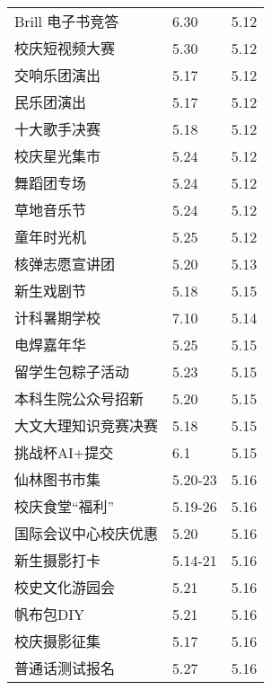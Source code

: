 \documentclass[letterpaper, 12pt]{article}
\begin{document}
\begin{multicols}{2}
{\begin{longtable}{|>{\centering\arraybackslash}m{}|m{}|m{}|}
    Brill 电子书竞答 & 6.30 & 5.12\\
    校庆短视频大赛 & 5.30 & 5.12\\
    交响乐团演出 & 5.17 & 5.12\\
    民乐团演出 & 5.17 & 5.12\\
    十大歌手决赛 & 5.18 & 5.12\\
    校庆星光集市 & 5.24 & 5.12\\
    舞蹈团专场 & 5.24 & 5.12\\
    草地音乐节 & 5.24 & 5.12\\
    童年时光机 & 5.25 & 5.12\\
    核弹志愿宣讲团 & 5.20 & 5.13\\
    新生戏剧节 & 5.18 & 5.15\\
    计科暑期学校 & 7.10 & 5.14\\
    电焊嘉年华 & 5.25 & 5.15\\
    留学生包粽子活动 & 5.23 & 5.15\\
    本科生院公众号招新 & 5.20 & 5.15\\
    大文大理知识竞赛决赛 & 5.18 & 5.15\\
    挑战杯AI+提交 & 6.1 & 5.15\\
    仙林图书市集 & 5.20-23 & 5.16\\
    校庆食堂“福利” & 5.19-26 & 5.16\\
    国际会议中心校庆优惠 & 5.20 & 5.16\\
    新生摄影打卡 & 5.14-21 & 5.16\\
    校史文化游园会 & 5.21 & 5.16\\
    帆布包DIY & 5.21 & 5.16\\
    校庆摄影征集 & 5.17 & 5.16\\
    普通话测试报名 & 5.27 & 5.16\\
    
    \hline
\end{longtable}
\unskip
\unpenalty
\unpenalty}\unvbox\colbbox
\end{multicols}
\end{document}
